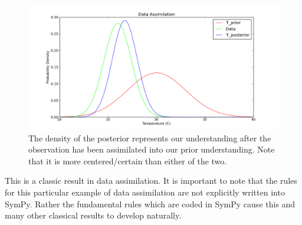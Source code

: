 \begin{figure}[ht]
\vspace{-0pt}
\centering
\includegraphics[width=.7\textwidth]{images/posterior.png}
\vspace{-0pt}
\caption{The density of the posterior represents our understanding after the observation has been assimilated into our prior understanding. Note that it is more centered/certain than either of the two. }
\label{fig:DA_posterior}
\vspace{00pt}
\end{figure}

This is a classic result in data assimilation. It is important to note that
the rules for this particular example of data assimilation are not explicitly written into SymPy. Rather the fundamental rules which are coded in SymPy cause this and many other classical results to develop naturally.
